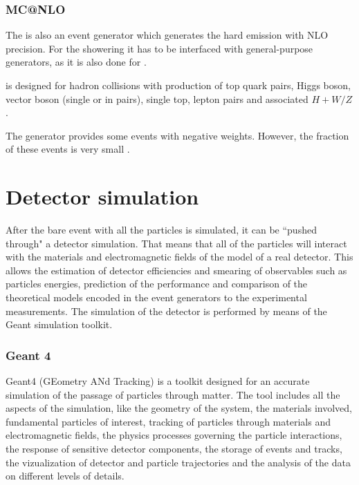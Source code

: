 \subsubsection{MC@NLO}

The \MCNLO \cite{Frixione:2002ik} is also an event generator which generates the hard emission with NLO precision. For the showering
it has to be interfaced with general-purpose generators, as it is also done for \Powheg. 

\MCNLO is designed for hadron collisions with production of top quark pairs, Higgs boson, vector boson (single or in pairs), single top,
lepton pairs and associated $H+W/Z$.

The \MCNLO generator provides some events with negative weights. However, the fraction of these events is very small \cite{Frixione:2002ik}.


\section{Detector simulation}

After the bare event with all the particles is simulated, it can be ``pushed through" a detector simulation. That means that all of the particles 
will interact with the materials and electromagnetic fields of the model of a real detector. This allows the estimation of 
detector efficiencies and smearing of observables such as particles energies, prediction of the performance and comparison of the theoretical 
models encoded in the event generators to
the experimental measurements. The simulation of the detector is performed by means of the Geant simulation toolkit.

\subsubsection{Geant 4}

Geant4 (GEometry ANd Tracking) \cite{Agostinelli:2002hh} is a toolkit designed for an accurate simulation of the passage of particles through matter.
The tool includes all the aspects of the simulation, like the geometry of the system, the materials involved, fundamental particles of interest,
tracking of particles through materials and electromagnetic fields, the physics processes governing the particle interactions, the response of
sensitive detector components, the storage of events and tracks, the vizualization of detector and particle trajectories and the analysis of
the data on different levels of details.

